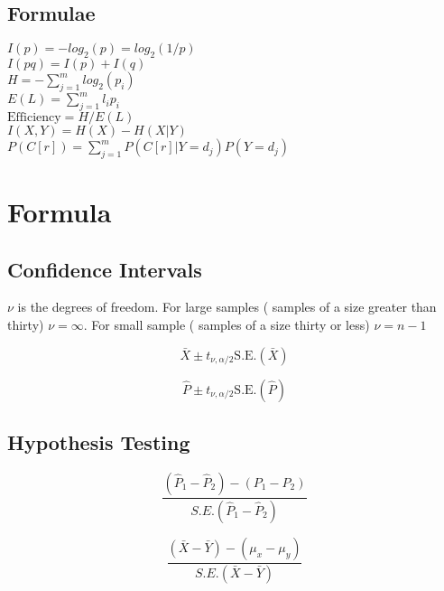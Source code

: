 \subsection{Formulae}

$I(p) = - log_{2}(p) = log_{2}(1/p)$\\

$I(pq) = I(p) + I(q)$\\

$H = - \sum_{j=1}^{m} log_{2}(p_{i})$\\

$E(L) = \sum_{j=1}^{m} l_{i} p_{i}$\\

$\mbox{Efficiency} = H / E(L)$\\

$I(X,Y) = H(X) - H(X|Y)$\\

$P(C[r]) = \sum_{j=1}^{m}P(C[r]|Y=d_{j} )P(Y=d_{j} )$


\section{Formula}
		
		\subsection{Confidence Intervals}
		
		$\nu$ is the degrees of freedom. For large samples ( samples of a
		size greater than thirty) $\nu = \infty$. For small sample (
		samples of a size thirty or less)  $\nu = n-1$
		
		\begin{equation}
		\bar{X} \pm t_{\nu,\alpha/2}\mbox{S.E.}(\bar{X})
		\end{equation}
		
		\begin{equation}
		\hat{P} \pm t_{\nu,\alpha/2}\mbox{S.E.}(\hat{P})
		\end{equation}
		
		\subsection{Hypothesis Testing}
		\begin{equation}
		\frac{(\hat{P}_{1}-\hat{P}_{2})-(P_{1}-P_{2})}{S.E.(\hat{P}_{1}-\hat{P}_{2})}
		\end{equation}
		
		\begin{equation}
		\frac{(\bar{X}-\bar{Y})-(\mu_{x}-\mu_{y})}{S.E.(\bar{X}-\bar{Y})}
		\end{equation}
		
		

